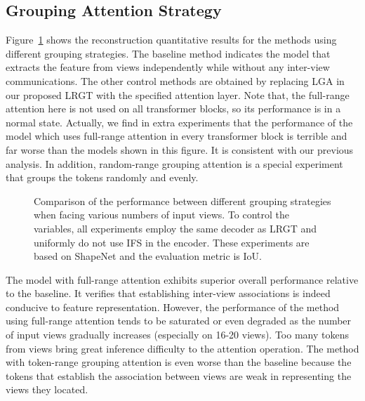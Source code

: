 \documentclass[10pt,twocolumn,letterpaper]{article}
\begin{document}
\subsection{Grouping Attention Strategy}
\label{experiments::strategy}
Figure~\ref{group_type} shows the reconstruction quantitative results for the methods using different grouping strategies. The baseline method indicates the model that extracts the feature from views independently while without any inter-view communications. The other control methods are obtained by replacing LGA in our proposed LRGT with the specified attention layer. Note that, the full-range attention here is not used on all transformer blocks, so its performance is in a normal state. Actually, we find in extra experiments that the performance of the model which uses full-range attention in every transformer block is terrible and far worse than the models shown in this figure. It is consistent with our previous analysis. In addition, random-range grouping attention is a special experiment that groups the tokens randomly and evenly.
\begin{figure}[t]
	\centering
	\caption{Comparison of the performance between different grouping strategies when facing various numbers of input views. To control the variables, all experiments employ the same decoder as LRGT and uniformly do not use IFS in the encoder. These experiments are based on ShapeNet and the evaluation metric is IoU.}
	\label{group_type}
\end{figure}

The model with full-range attention exhibits superior overall performance relative to the baseline. It verifies that establishing inter-view associations is indeed conducive to feature representation. However, the performance of the method using full-range attention tends to be saturated or even degraded as the number of input views gradually increases (especially on 16-20 views). Too many tokens from views bring great inference difficulty to the attention operation. The method with token-range grouping attention is even worse than the baseline because the tokens that establish the association between views are weak in representing the views they located.
\end{document}
